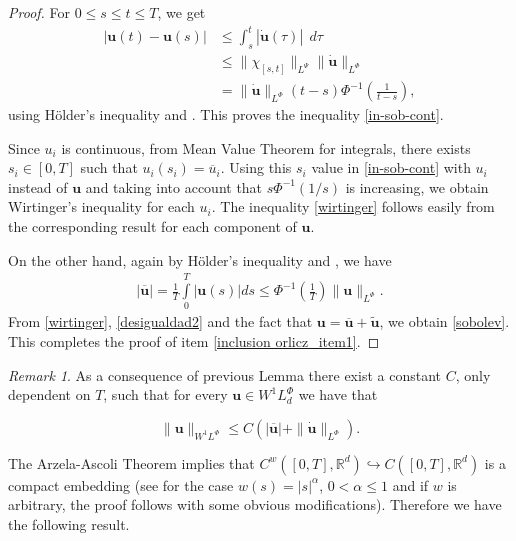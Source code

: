 \documentclass[twoside]{article}
\theoremstyle{remark}
\newtheorem{comentario}{Remark}
\newcommand{\orlnor}{\|_{L^{\Phi}}}
\newcommand{\lphi}{L^{\Phi}}
\newcommand{\lpsi}{L^{\Psi}}
\newcommand{\wphi}{W^{1}\lphi}
\newcommand{\sobnor}{\|_{W^{1}\lphi}}
\renewcommand{\b}[1]{\boldsymbol{#1}}
\newcommand{\rr}{\mathbb{R}}
\renewcommand{\leq}{\leqslant}
\begin{document}
\begin{proof}
For $0 \leq
s\leq t \leq T $, we get
\begin{equation}\label{equicont}
\begin{split}
\left|\b{u}(t)-\b{u}(s) \right| &\leq \int_{s}^t \left| \b{\dot{u}}(\tau)\right|\ \ d\tau\\
&\leq \| \chi_{[s,t]}\|_{\lpsi}\|\b{\dot{u}}\|_{\lphi}\\
&= \|\b{\dot{u}}\|_{\lphi} ( t-s)\Phi^{-1}\left(\frac{1}{t-s}\right),
\end{split}
\end{equation}
using H\"older's inequality and \cite[Eq. (9.11)]{KR}.
This proves the inequality \eqref{in-sob-cont}.

Since $u_i$ is continuous, from Mean Value Theorem for integrals, 
there exists  $s_i\in [0,T]$ such that $u_i(s_i)=\overline{u}_i$.
Using this $s_i$ value in \eqref{in-sob-cont} with $u_i$ instead of $\b{u}$ and taking into account that $s\Phi^{-1}(1/s)$ is increasing, 
we obtain  Wirtinger's inequality for each $u_i$. The inequality \eqref{wirtinger} 
follows easily from the corresponding result for each component of $\b{u}$.

On the other hand, again by H\"older's inequality and \cite[Eq. (9.11)]{KR}, we have
\begin{equation}\label{desigualdad2}\begin{split}
|\overline{\b{u}}|= \frac{1}{T}\int\limits_{0}^{T}|\b{u}(s)|ds\leq \Phi^{-1}\left(\frac{1}{T}\right)\|\b{u}\orlnor.
\end{split}
\end{equation}
From \eqref{wirtinger}, \eqref{desigualdad2} and the fact that $\b{u}=\overline{\b{u}}+\widetilde{\b{u}}$,  we obtain \eqref{sobolev}. This completes the proof of item \ref{inclusion orlicz_item1}.
\end{proof}

\begin{comentario}
As a consequence of previous Lemma  there exist a constant $C$, only dependent on $T$, such that for every $\b{u}\in\wphi_d$ we have that

\begin{equation}\label{cota_prome}\|\b{u}\sobnor\leq C\left(|\b{\overline{u}}|+\|\b{\dot{u}}\orlnor\right).\end{equation}

\end{comentario}

The Arzela-Ascoli Theorem implies that  $C^w([0,T],\rr^d)\hookrightarrow C([0,T],\rr^d)$ is a compact  embedding (see \cite[Ch. 5]{driver} for the case $w(s)=|s|^{\alpha}$, $0< \alpha\leq 1$ and if  $w$ is arbitrary, the proof follows with some obvious modifications). Therefore we have the following result.
\end{document}
